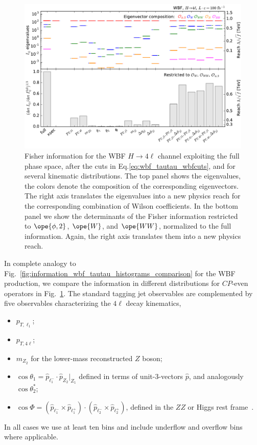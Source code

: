 \begin{figure}[t!]
  \includegraphics[height=0.6 \textwidth]{fig/information/wbf_4l_histos_comparison}
  \caption{Fisher information for the WBF $H \to 4 \ell$ channel
    exploiting the full phase space, after the cuts in
    Eq.\;\eqref{eq:wbf_tautau_wbfcuts}, and for several kinematic
    distributions.  The top panel shows the eigenvalues, the colors
    denote the composition of the corresponding eigenvectors. The
    right axis translates the eigenvalues into a new physics reach for
    the corresponding combination of Wilson coefficients.  In the
    bottom panel we show the determinants of the Fisher information
    restricted to $\ope{\phi,2}$, $\ope{W}$, and $\ope{WW}$,
    normalized to the full information. Again, the right axis
    translates them into a new physics reach.}
\label{fig:information_wbf_4l_histograms_comparison}
\end{figure}

In complete analogy to Fig.~\ref{fig:information_wbf_tautau_histograms_comparison}
for the WBF production, we compare the information in different
distributions for $CP$-even operators in
Fig.~\ref{fig:information_wbf_4l_histograms_comparison}.  The standard tagging jet
observables are complemented by five observables characterizing the
$4\ell$ decay kinematics,
%
\begin{itemize}[label=\raisebox{0.1ex}{\scriptsize$\bullet$}]
  \item $p_{T,\ell_1}$;
  \item $p_{T,4\ell}$;
  \item $m_{Z_2}$ for the lower-mass reconstructed $Z$ boson;
  \item $\cos \theta_1 = \hat{p}_{\ell^-_1} \cdot \hat{p}_{Z_2}
    \Big|_{Z_1}$ defined in terms of unit-3-vectors $\hat{p}$, and analogously
    $\cos \theta_2^*$;
  \item $\cos \Phi = ( \hat{p}_{\ell^-_1} \times
    \hat{p}_{\ell^+_1} ) \cdot ( \hat{p}_{\ell^-_2} \times
    \hat{p}_{\ell^+_2} )$, defined in the $ZZ$ or Higgs rest
    frame~\cite{phi_jj}.
\end{itemize}
%
In all cases we use at least ten bins and include underflow and
overflow bins where applicable.

